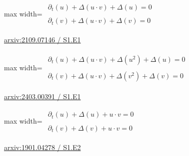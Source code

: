 \documentclass[10pt,a4paper]{article}
\begin{document}
\begin{minipage}{\linewidth}
\begin{center}\begin{adjustbox}{max width=\linewidth}$\displaystyle\begin{gathered}\begin{gathered}\partial_{t}(u)+\Delta(u\cdot v)+\Delta(u)=0\end{gathered}\\[5pt]\begin{gathered}\partial_{t}(v)+\Delta(u\cdot v)+\Delta(v)=0\end{gathered}\end{gathered}$\end{adjustbox}\end{center}
{\small \href{https://arxiv.org/html/2109.07146#S1.E1}{arxiv:2109.07146 / S1.E1}}\par
\end{minipage}\par\vspace{7mm}

\begin{minipage}{\linewidth}
\begin{center}\begin{adjustbox}{max width=\linewidth}$\displaystyle\begin{gathered}\begin{gathered}\partial_{t}(u)+\Delta(u\cdot v)+\Delta(u^{2})+\Delta(u)=0\end{gathered}\\[5pt]\begin{gathered}\partial_{t}(v)+\Delta(u\cdot v)+\Delta(v^{2})+\Delta(v)=0\end{gathered}\end{gathered}$\end{adjustbox}\end{center}
{\small \href{https://arxiv.org/html/2403.00391#S1.E1}{arxiv:2403.00391 / S1.E1}}\par
\end{minipage}\par\vspace{7mm}

\begin{minipage}{\linewidth}
\begin{center}\begin{adjustbox}{max width=\linewidth}$\displaystyle\begin{gathered}\begin{gathered}\partial_{t}(u)+\Delta(u)+u\cdot v=0\end{gathered}\\[5pt]\begin{gathered}\partial_{t}(v)+\Delta(v)+u\cdot v=0\end{gathered}\end{gathered}$\end{adjustbox}\end{center}
{\small \href{https://arxiv.org/html/1901.04278#S1.E2}{arxiv:1901.04278 / S1.E2}}\par
\end{minipage}\par\vspace{7mm}
\end{document}
